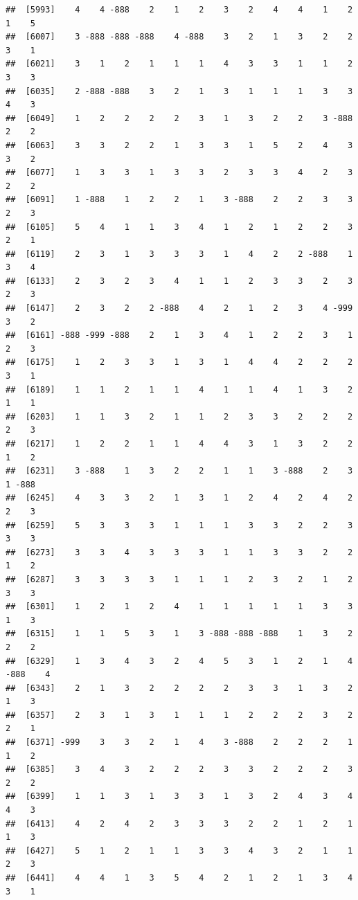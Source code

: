 \documentclass[
  12pt,
  openany]{book}
\begin{document}
\begin{verbatim}
##  [5993]    4    4 -888    2    1    2    3    2    4    4    1    2    1    5
##  [6007]    3 -888 -888 -888    4 -888    3    2    1    3    2    2    3    1
##  [6021]    3    1    2    1    1    1    4    3    3    1    1    2    3    3
##  [6035]    2 -888 -888    3    2    1    3    1    1    1    3    3    4    3
##  [6049]    1    2    2    2    2    3    1    3    2    2    3 -888    2    2
##  [6063]    3    3    2    2    1    3    3    1    5    2    4    3    3    2
##  [6077]    1    3    3    1    3    3    2    3    3    4    2    3    2    2
##  [6091]    1 -888    1    2    2    1    3 -888    2    2    3    3    2    3
##  [6105]    5    4    1    1    3    4    1    2    1    2    2    3    2    1
##  [6119]    2    3    1    3    3    3    1    4    2    2 -888    1    3    4
##  [6133]    2    3    2    3    4    1    1    2    3    3    2    3    2    3
##  [6147]    2    3    2    2 -888    4    2    1    2    3    4 -999    3    2
##  [6161] -888 -999 -888    2    1    3    4    1    2    2    3    1    2    3
##  [6175]    1    2    3    3    1    3    1    4    4    2    2    2    3    1
##  [6189]    1    1    2    1    1    4    1    1    4    1    3    2    1    1
##  [6203]    1    1    3    2    1    1    2    3    3    2    2    2    2    3
##  [6217]    1    2    2    1    1    4    4    3    1    3    2    2    1    2
##  [6231]    3 -888    1    3    2    2    1    1    3 -888    2    3    1 -888
##  [6245]    4    3    3    2    1    3    1    2    4    2    4    2    2    3
##  [6259]    5    3    3    3    1    1    1    3    3    2    2    3    3    3
##  [6273]    3    3    4    3    3    3    1    1    3    3    2    2    1    2
##  [6287]    3    3    3    3    1    1    1    2    3    2    1    2    3    3
##  [6301]    1    2    1    2    4    1    1    1    1    1    3    3    1    3
##  [6315]    1    1    5    3    1    3 -888 -888 -888    1    3    2    2    2
##  [6329]    1    3    4    3    2    4    5    3    1    2    1    4 -888    4
##  [6343]    2    1    3    2    2    2    2    3    3    1    3    2    1    3
##  [6357]    2    3    1    3    1    1    1    2    2    2    3    2    2    1
##  [6371] -999    3    3    2    1    4    3 -888    2    2    2    1    1    2
##  [6385]    3    4    3    2    2    2    3    3    2    2    2    3    2    2
##  [6399]    1    1    3    1    3    3    1    3    2    4    3    4    4    3
##  [6413]    4    2    4    2    3    3    3    2    2    1    2    1    1    3
##  [6427]    5    1    2    1    1    3    3    4    3    2    1    1    2    3
##  [6441]    4    4    1    3    5    4    2    1    2    1    3    4    3    1

\end{verbatim}
\end{document}
